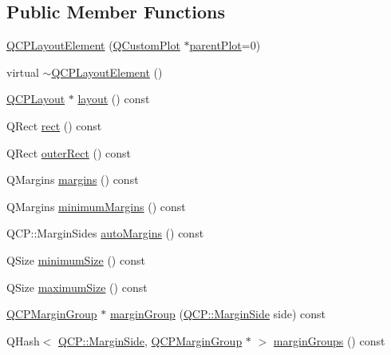 \subsection*{Public Member Functions}
\begin{DoxyCompactItemize}
\item 
\hyperlink{class_q_c_p_layout_element_a8947f0ada17e672aaba3d424cbbb67e3}{Q\+C\+P\+Layout\+Element} (\hyperlink{class_q_custom_plot}{Q\+Custom\+Plot} $\ast$\hyperlink{class_q_c_p_layerable_ab7e0e94461566093d36ffc0f5312b109}{parent\+Plot}=0)
\item 
virtual \hyperlink{class_q_c_p_layout_element_a0dc52343920011b3e72d61fc94ed3400}{$\sim$\+Q\+C\+P\+Layout\+Element} ()
\item 
\hyperlink{class_q_c_p_layout}{Q\+C\+P\+Layout} $\ast$ \hyperlink{class_q_c_p_layout_element_a6235f5384db871fc6e3387a1bc558b0d}{layout} () const 
\item 
Q\+Rect \hyperlink{class_q_c_p_layout_element_affdfea003469aac3d0fac5f4e06171bc}{rect} () const 
\item 
Q\+Rect \hyperlink{class_q_c_p_layout_element_a60bbddee2d1230c2414bd776f44d17b8}{outer\+Rect} () const 
\item 
Q\+Margins \hyperlink{class_q_c_p_layout_element_a85ff977dfcced84eef32d9f819ec9543}{margins} () const 
\item 
Q\+Margins \hyperlink{class_q_c_p_layout_element_a60ec7f377c26726174d536bffb632002}{minimum\+Margins} () const 
\item 
Q\+C\+P\+::\+Margin\+Sides \hyperlink{class_q_c_p_layout_element_a2f499b1179b3126e22d0d7508124ccb3}{auto\+Margins} () const 
\item 
Q\+Size \hyperlink{class_q_c_p_layout_element_ae71f9230171d2d898e21dc461fc3df03}{minimum\+Size} () const 
\item 
Q\+Size \hyperlink{class_q_c_p_layout_element_a1fc85c79e15c2ab8051eccd455fccc4a}{maximum\+Size} () const 
\item 
\hyperlink{class_q_c_p_margin_group}{Q\+C\+P\+Margin\+Group} $\ast$ \hyperlink{class_q_c_p_layout_element_a22cb1bb62c452fd802e43ca2524660db}{margin\+Group} (\hyperlink{namespace_q_c_p_a7e487e3e2ccb62ab7771065bab7cae54}{Q\+C\+P\+::\+Margin\+Side} side) const 
\item 
Q\+Hash$<$ \hyperlink{namespace_q_c_p_a7e487e3e2ccb62ab7771065bab7cae54}{Q\+C\+P\+::\+Margin\+Side}, \hyperlink{class_q_c_p_margin_group}{Q\+C\+P\+Margin\+Group} $\ast$ $>$ \hyperlink{class_q_c_p_layout_element_ac43921c997570389c14a1671bc3ea499}{margin\+Groups} () const 

\end{DoxyCompactItemize}
